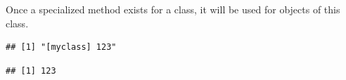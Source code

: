 \documentclass[krantz2]{krantz}\usepackage{knitr}%
\begin{document}
Once a specialized method exists for a class, it will be used for objects of this class.

\begin{knitrout}\footnotesize
{}\color{fgcolor}\begin{kframe}
\begin{alltt}
\end{alltt}
\begin{verbatim}
## [1] "[myclass] 123"
\end{verbatim}
\begin{alltt}
\hlstd{(}
\end{alltt}
\begin{verbatim}
## [1] 123
\end{verbatim}
\end{kframe}
\end{knitrout}
\end{document}
